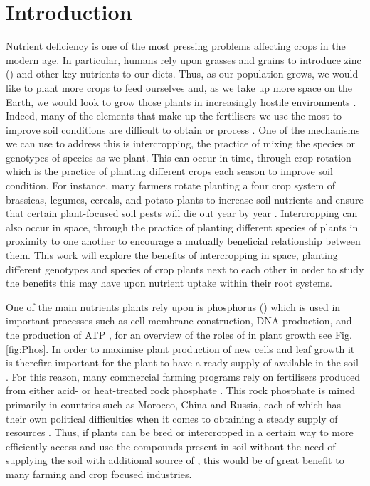 \documentclass[11pt]{article}
\numberwithin{equation}{section}
\begin{document}


\section{Introduction}

Nutrient deficiency is one of the most pressing problems affecting crops in the modern age. In particular, humans rely upon grasses and grains to introduce zinc () and other key nutrients to our diets. Thus, as our population grows, we would like to plant more crops to feed ourselves and, as we take up more space on the Earth, we would look to grow those plants in increasingly hostile environments \cite{calicioglu_2019}. Indeed,  many of the elements that make up the fertilisers we use the most to improve soil conditions are difficult to obtain or process \cite{fact.mr_2021}. One of the mechanisms we can use to address this is intercropping, the practice of mixing the species or genotypes of species as we plant. This can occur in time, through crop rotation which is the practice of planting different crops each season to improve soil condition. For instance, many farmers rotate planting a four crop system of brassicas, legumes, cereals, and potato plants to increase soil nutrients and ensure that certain plant-focused soil pests will die out year by year \cite{xuan_2011}. Intercropping can also occur in space, through the practice of planting different species of plants in proximity to one another to encourage a mutually beneficial relationship between them. This work will explore the benefits of intercropping in space, planting different genotypes and species of crop plants next to each other in order to study the benefits this may have upon nutrient uptake within their root systems.

One of the main nutrients plants rely upon is phosphorus () which is used in important processes such as cell membrane construction, DNA production, and the production of ATP \cite{vysotskaya_2016}, for an overview of the roles of  in plant growth see Fig. \ref{fig:Phos}. In order to maximise plant production of new cells and leaf growth it is therefire important for the plant to have a ready supply of  available in the soil \cite{vysotskaya_2016}. For this reason, many commercial farming programs rely on  fertilisers produced from either acid- or heat-treated rock phosphate \cite{PhosporusRecoveryandRecycling}. This rock phosphate is mined primarily in countries such as Morocco, China and Russia, each of which has their own political difficulties when it comes to obtaining a steady supply of resources \cite{fact.mr_2021}. Thus, if plants can be bred or intercropped in a certain way to more efficiently access and use the  compounds present in soil without the need of supplying the soil with additional source of , this would be of great benefit to many farming and crop focused industries.
\end{document}
